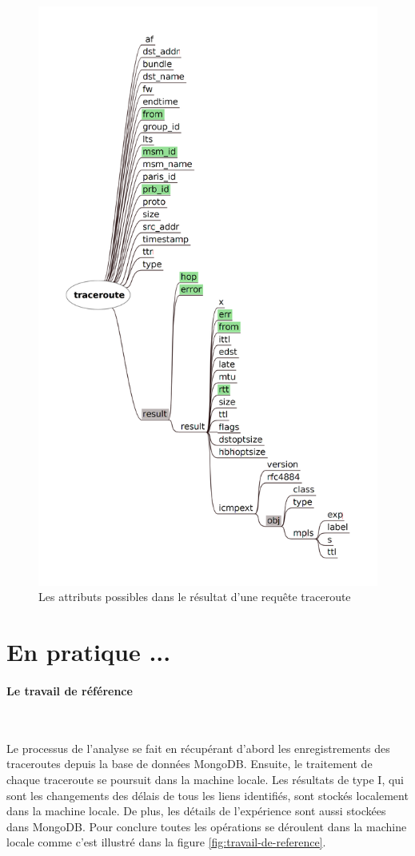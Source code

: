 \begin{figure}[H]
\centering
\includegraphics[width=0.7\linewidth]{illustrations/traceroute_attributes}
\caption{Les attributs possibles dans le résultat d'une requête traceroute}
\label{fig:traceroute_attributes}
\end{figure}


\newpage

\section{En pratique ...}

\paragraph{Le travail de référence}~

Le processus de l'analyse se fait en récupérant  d'abord les enregistrements des traceroutes depuis la base de données MongoDB. Ensuite, le traitement de chaque traceroute se poursuit dans la machine locale. Les résultats de type I, qui sont les changements des délais de tous les liens identifiés,   sont stockés localement dans la machine locale.
De plus, les détails de l'expérience sont aussi stockées dans MongoDB. Pour conclure toutes les opérations se déroulent dans la machine locale comme c'est illustré dans la figure \ref{fig:travail-de-reference}.

